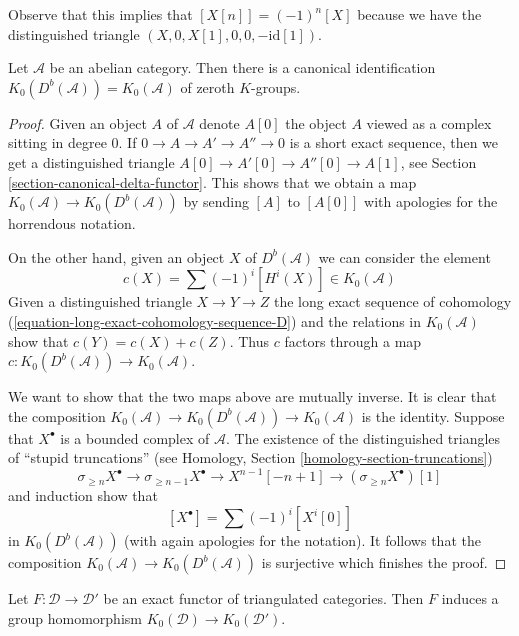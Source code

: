 \noindent
Observe that this implies that $[X[n]] = (-1)^n[X]$ because we have
the distinguished triangle $(X, 0, X[1], 0, 0, -\text{id}[1])$.

\begin{lemma}
\label{lemma-K-bounded-derived}
Let $\mathcal{A}$ be an abelian category. Then there is a canonical
identification $K_0(D^b(\mathcal{A})) = K_0(\mathcal{A})$
of zeroth $K$-groups.
\end{lemma}

\begin{proof}
Given an object $A$ of $\mathcal{A}$ denote $A[0]$ the object $A$
viewed as a complex sitting in degree $0$.
If $0 \to A \to A' \to A'' \to 0$ is a short
exact sequence, then we get a distinguished triangle
$A[0] \to A'[0] \to A''[0] \to A[1]$, see
Section \ref{section-canonical-delta-functor}.
This shows that we obtain a map $K_0(\mathcal{A}) \to K_0(D^b(\mathcal{A}))$
by sending $[A]$ to $[A[0]]$ with apologies for the horrendous notation.

\medskip\noindent
On the other hand, given an object $X$ of $D^b(\mathcal{A})$ we can
consider the element
$$
c(X) = \sum (-1)^i[H^i(X)] \in K_0(\mathcal{A})
$$
Given a distinguished triangle $X \to Y \to Z$ the long exact sequence
of cohomology (\ref{equation-long-exact-cohomology-sequence-D})
and the relations in $K_0(\mathcal{A})$ show that
$c(Y) = c(X) + c(Z)$. Thus $c$ factors through a map
$c : K_0(D^b(\mathcal{A})) \to K_0(\mathcal{A})$.

\medskip\noindent
We want to show that the two maps above are mutually inverse.
It is clear that the composition $K_0(\mathcal{A}) \to
K_0(D^b(\mathcal{A})) \to K_0(\mathcal{A})$ is the identity.
Suppose that $X^\bullet$ is a bounded complex of $\mathcal{A}$.
The existence of the distinguished triangles of ``stupid truncations'' (see
Homology, Section \ref{homology-section-truncations})
$$
\sigma_{\geq n}X^\bullet \to \sigma_{\geq n - 1}X^\bullet \to
X^{n - 1}[-n + 1] \to (\sigma_{\geq n}X^\bullet)[1]
$$
and induction show that
$$
[X^\bullet] = \sum (-1)^i[X^i[0]]
$$
in $K_0(D^b(\mathcal{A}))$ (with again apologies for the notation).
It follows that the composition
$K_0(\mathcal{A}) \to K_0(D^b(\mathcal{A}))$ is surjective
which finishes the proof.
\end{proof}

\begin{lemma}
\label{lemma-map-K}
Let $F : \mathcal{D} \to \mathcal{D}'$ be an exact functor of triangulated
categories. Then $F$ induces a group homomorphism
$K_0(\mathcal{D}) \to K_0(\mathcal{D}')$.
\end{lemma}

